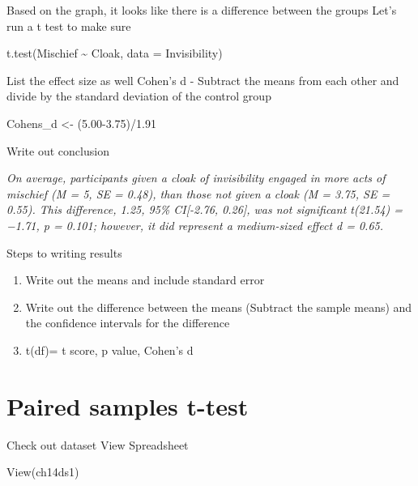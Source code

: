 \documentclass[
]{book}
\newenvironment{Shaded}{\begin{snugshade}}{\end{snugshade}}
\newcommand{\AttributeTok}[1]{\textcolor[rgb]{0.77,0.63,0.00}{#1}}
\newcommand{\FloatTok}[1]{\textcolor[rgb]{0.00,0.00,0.81}{#1}}
\newcommand{\FunctionTok}[1]{\textcolor[rgb]{0.00,0.00,0.00}{#1}}
\newcommand{\NormalTok}[1]{#1}
\newcommand{\OtherTok}[1]{\textcolor[rgb]{0.56,0.35,0.01}{#1}}
\newcommand{\SpecialCharTok}[1]{\textcolor[rgb]{0.00,0.00,0.00}{#1}}
\providecommand{\tightlist}{%
  \setlength{\itemsep}{0pt}\setlength{\parskip}{0pt}}
\begin{document}
Based on the graph, it looks like there is a difference between the groups Let's run a t test to make sure

\begin{Shaded}
\begin{Highlighting}[]
\FunctionTok{t.test}\NormalTok{(Mischief }\SpecialCharTok{\textasciitilde{}}\NormalTok{ Cloak, }\AttributeTok{data =}\NormalTok{ Invisibility)}
\end{Highlighting}
\end{Shaded}

List the effect size as well
Cohen's d - Subtract the means from each other and
divide by the standard deviation of the control group

\begin{Shaded}
\begin{Highlighting}[]
\NormalTok{Cohens\_d }\OtherTok{\textless{}{-}}\NormalTok{ (}\FloatTok{5.00{-}3.75}\NormalTok{)}\SpecialCharTok{/}\FloatTok{1.91}
\end{Highlighting}
\end{Shaded}

Write out conclusion

\emph{On average, participants given a cloak of invisibility engaged in
more acts of mischief (M = 5, SE = 0.48), than those not given a
cloak (M = 3.75, SE = 0.55). This difference, 1.25, 95\% CI{[}-2.76, 0.26{]},
was not significant t(21.54) = −1.71, p = 0.101; however, it did
represent a medium-sized effect d = 0.65.}

Steps to writing results

\begin{enumerate}
\def\labelenumi{\arabic{enumi}.}
\tightlist
\item
  Write out the means and include standard error
\item
  Write out the difference between the means (Subtract the sample means) and the confidence intervals for the difference
\item
  t(df)= t score, p value, Cohen's d
\end{enumerate}

\hypertarget{paired-samples-t-test}{%
\chapter{Paired samples t-test}\label{paired-samples-t-test}}

Check out dataset
View Spreadsheet

\begin{Shaded}
\begin{Highlighting}[]
\FunctionTok{View}\NormalTok{(ch14ds1)}
\end{Highlighting}
\end{Shaded}
\end{document}

